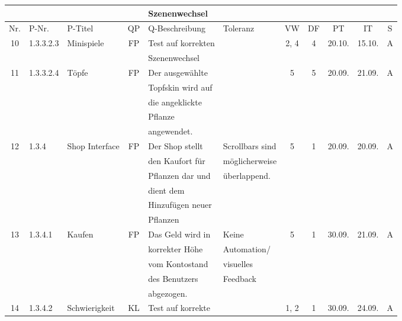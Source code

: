 \begin{longtable}{|c|l|l|c|l|l|c|c|c|c|c|}
            &       &            &    & Szenenwechsel &   &   & & & &\\[5ex]
            \hline
            \hline
            Nr. & P-Nr. & P-Titel & QP & Q-Beschreibung & Toleranz & VW & DF & PT & IT & S \\[0.5ex]
            \hline\hline
            10 & 1.3.3.2.3 & Minispiele & FP & Test auf korrekten &  & 2, 4 & 4 & 20.10. & 15.10. & A \\
            &       &            &    & Szenenwechsel &   &   & & & &\\
            \hline
            11 & 1.3.3.2.4 & Töpfe & FP & Der ausgewählte &  & 5 & 5 & 20.09. & 21.09. & A \\
            &       &            &    & Topfskin wird auf&   &   & & & &\\
            &       &            &    & die angeklickte &   &   & & & &\\
            &       &            &    & Pflanze &   &   & & & &\\
            &       &            &    & angewendet. &   &   & & & &\\
            \hline
            12 & 1.3.4 & Shop Interface & FP & Der Shop stellt & Scrollbars sind & 5 & 1 & 20.09. & 20.09. & A \\
            &       &            &    & den Kaufort für & möglicherweise  &   & & & &\\
            &       &            &    & Pflanzen dar und & überlappend.  &   & & & &\\
            &       &            &    & dient dem &   &   & & & &\\
            &       &            &    & Hinzufügen neuer &   &   & & & &\\
            &       &            &    & Pflanzen &   &   & & & &\\
            \hline
            13 & 1.3.4.1 & Kaufen & FP & Das Geld wird in & Keine & 5 & 1 & 30.09. & 21.09. & A \\
            &       &            &    & korrekter Höhe & Automation/  &   & & & &\\
            &       &            &    & vom Kontostand &  visuelles &   & & & &\\
            &       &            &    & des Benutzers & Feedback   &   & & & &\\
            &       &            &    & abgezogen. &   &   & & & &\\
            \hline
            14 & 1.3.4.2 & Schwierigkeit & KL & Test auf korrekte &  & 1, 2 & 1 & 30.09. & 24.09. & A \\

\end{longtable}
